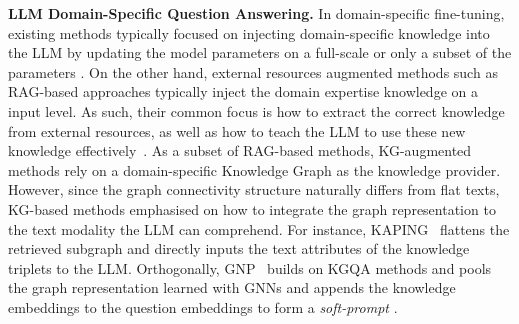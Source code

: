 \textbf{LLM Domain-Specific Question Answering. }
In domain-specific fine-tuning, existing methods typically focused on injecting domain-specific knowledge into the LLM by updating the model parameters on a full-scale or only a subset of the parameters \parencite{pmc-llama, medalpaca, llava-med}. 
On the other hand, external resources augmented methods such as RAG-based approaches typically inject the domain expertise knowledge on a input level.
As such, their common focus is how to extract the correct knowledge from external resources, as well as how to teach the LLM to use these new knowledge effectively~\parencite{knowpat, radit}. 
As a subset of RAG-based methods, KG-augmented methods rely on a domain-specific Knowledge Graph as the knowledge provider.
However, since the graph connectivity structure naturally differs from flat texts, KG-based methods emphasised on how to integrate the graph representation to the text modality the LLM can comprehend. 
For instance, KAPING~\parencite{kalm-prompting} flattens the retrieved subgraph and directly inputs the text attributes of the knowledge triplets to the LLM. 
Orthogonally, GNP~\parencite{gnp} builds on KGQA methods and pools the graph representation learned with GNNs and appends the knowledge embeddings to the question embeddings to form a \emph{soft-prompt} \parencite{prompt-tuning}.


